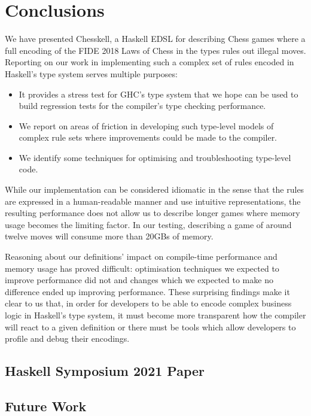 \chapter{Conclusions}

We have presented Chesskell, a Haskell EDSL for describing Chess games where a full encoding of the FIDE 2018 Laws of Chess in the types rules out illegal moves. Reporting on our work in implementing such a complex set of rules encoded in Haskell's type system serves multiple purposes:

\begin{itemize}
    \item It provides a stress test for GHC's type system that we hope can be used to build regression tests for the compiler's type checking performance.
    \item We report on areas of friction in developing such type-level models of complex rule sets where improvements could be made to the compiler.
    \item We identify some techniques for optimising and troubleshooting type-level code.
\end{itemize}

While our implementation can be considered idiomatic in the sense that the rules are expressed in a human-readable manner and use intuitive representations, the resulting performance does not allow us to describe longer games where memory usage becomes the limiting factor. In our testing, describing a game of around twelve moves will consume more than 20GBs of memory.

Reasoning about our definitions' impact on compile-time performance and memory usage has proved difficult: optimisation techniques we expected to improve performance did not and changes which we expected to make no difference ended up improving performance. These surprising findings make it clear to us that, in order for developers to be able to encode complex business logic in Haskell's type system, it must become more transparent how the compiler will react to a given definition or there must be tools which allow developers to profile and debug their encodings.

\section{Haskell Symposium 2021 Paper}


\section{Future Work}

